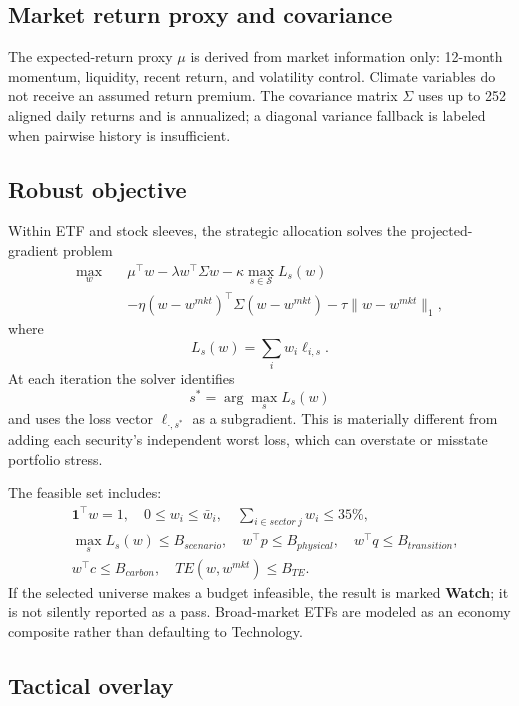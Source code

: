 \documentclass[10pt]{article}
\begin{document}
\subsection{Market return proxy and covariance}

The expected-return proxy $\mu$ is derived from market information only: 12-month momentum, liquidity, recent return, and volatility control. Climate variables do not receive an assumed return premium. The covariance matrix $\Sigma$ uses up to 252 aligned daily returns and is annualized; a diagonal variance fallback is labeled when pairwise history is insufficient.

\subsection{Robust objective}

Within ETF and stock sleeves, the strategic allocation solves the projected-gradient problem
\begin{align}
\max_{w}\quad
&\mu^\top w-\lambda w^\top\Sigma w
-\kappa\max_{s\in\mathcal{S}}L_s(w)\nonumber\\
&-\eta(w-w^{mkt})^\top\Sigma(w-w^{mkt})
-\tau\lVert w-w^{mkt}\rVert_1,
\end{align}
where
\begin{equation}
L_s(w)=\sum_i w_i\ell_{i,s}.
\end{equation}
At each iteration the solver identifies
\begin{equation}
s^*=\arg\max_s L_s(w)
\end{equation}
and uses the loss vector $\ell_{\cdot,s^*}$ as a subgradient. This is materially different from adding each security's independent worst loss, which can overstate or misstate portfolio stress.

The feasible set includes:
\begin{align*}
&\mathbf{1}^\top w=1,\quad 0\le w_i\le \bar w_i,\quad \sum_{i\in sector\ j}w_i\le 35\%,\\
&\max_s L_s(w)\le B_{scenario},\quad w^\top p\le B_{physical},\quad w^\top q\le B_{transition},\\
&w^\top c\le B_{carbon},\quad TE(w,w^{mkt})\le B_{TE}.
\end{align*}
If the selected universe makes a budget infeasible, the result is marked \textbf{Watch}; it is not silently reported as a pass. Broad-market ETFs are modeled as an economy composite rather than defaulting to Technology.

\subsection{Tactical overlay}
\end{document}
